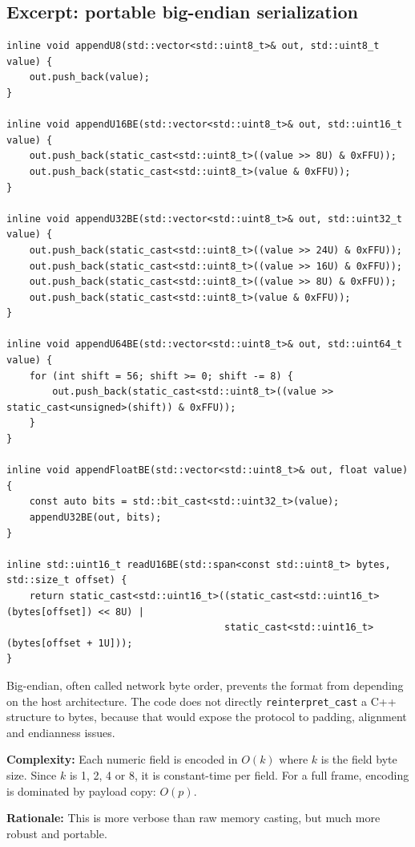 \documentclass[10pt,a4paper]{article}
\newcommand{\complexity}[1]{\textbf{Complexity:} #1}
\newcommand{\rationale}[1]{\textbf{Rationale:} #1}
\begin{document}
\subsection{Excerpt: portable big-endian serialization}
\begin{lstlisting}[caption={Explicit big-endian serialization}]
inline void appendU8(std::vector<std::uint8_t>& out, std::uint8_t value) {
    out.push_back(value);
}

inline void appendU16BE(std::vector<std::uint8_t>& out, std::uint16_t value) {
    out.push_back(static_cast<std::uint8_t>((value >> 8U) & 0xFFU));
    out.push_back(static_cast<std::uint8_t>(value & 0xFFU));
}

inline void appendU32BE(std::vector<std::uint8_t>& out, std::uint32_t value) {
    out.push_back(static_cast<std::uint8_t>((value >> 24U) & 0xFFU));
    out.push_back(static_cast<std::uint8_t>((value >> 16U) & 0xFFU));
    out.push_back(static_cast<std::uint8_t>((value >> 8U) & 0xFFU));
    out.push_back(static_cast<std::uint8_t>(value & 0xFFU));
}

inline void appendU64BE(std::vector<std::uint8_t>& out, std::uint64_t value) {
    for (int shift = 56; shift >= 0; shift -= 8) {
        out.push_back(static_cast<std::uint8_t>((value >> static_cast<unsigned>(shift)) & 0xFFU));
    }
}

inline void appendFloatBE(std::vector<std::uint8_t>& out, float value) {
    const auto bits = std::bit_cast<std::uint32_t>(value);
    appendU32BE(out, bits);
}

inline std::uint16_t readU16BE(std::span<const std::uint8_t> bytes, std::size_t offset) {
    return static_cast<std::uint16_t>((static_cast<std::uint16_t>(bytes[offset]) << 8U) |
                                      static_cast<std::uint16_t>(bytes[offset + 1U]));
}

\end{lstlisting}


Big-endian, often called network byte order, prevents the format from depending on the host architecture. The code does not directly \texttt{reinterpret\_cast} a C++ structure to bytes, because that would expose the protocol to padding, alignment and endianness issues.

\complexity{Each numeric field is encoded in $O(k)$ where $k$ is the field byte size. Since $k$ is 1, 2, 4 or 8, it is constant-time per field. For a full frame, encoding is dominated by payload copy: $O(p)$.}

\rationale{This is more verbose than raw memory casting, but much more robust and portable.}
\end{document}
